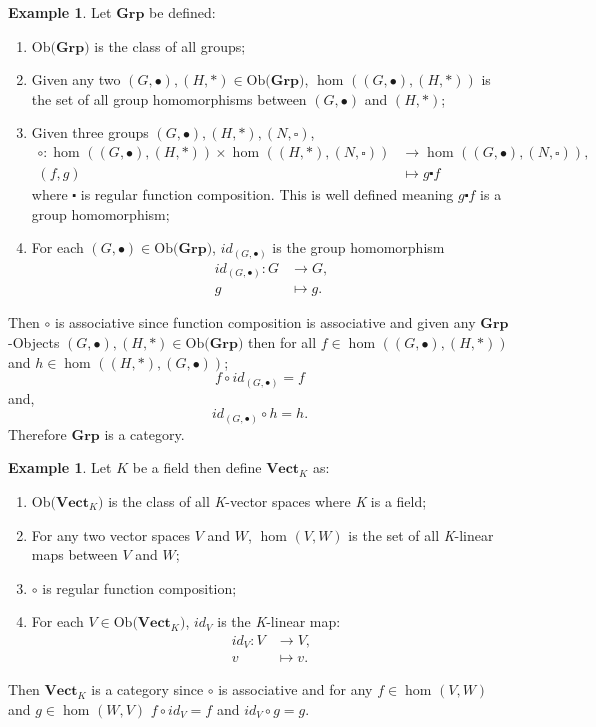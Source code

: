 \documentclass[11pt,a4paper]{article}
\theoremstyle{definition}
\newtheorem{example}[thm]{Example}
\newcommand\ho[3][]{\hom_{#1}(#2,#3)}
\newcommand\ob[1]{\mathrm{Ob(}#1\mathrm{)}}
\newcommand\objs[1]{#1-Objects}
\numberwithin{equation}{section}
\begin{document}
\begin{example}
\label{exe:catoggroups}
Let $\mathbf{Grp}$ be defined:
\begin{enumerate}
    \item $\ob{\mathbf{Grp}}$ is the class of all groups;
    \item Given any two $(G,\bullet),(H,*)\in\ob{\mathbf{Grp}}$, $\ho{(G,\bullet)}{(H,*)}$ is the set of all group homomorphisms between $(G,\bullet)$ and $(H,*)$;
    \item Given three groups $(G,\bullet),(H,*),(N,\square)$,
    \begin{align*}
        \circ\colon\ho{(G,\bullet)}{(H,*)}\times\ho{(H,*)}{(N,\square)}&\rightarrow\ho{(G,\bullet)}{(N,\square)},\\
        (f,g)&\mapsto g\centerdot f
    \end{align*}
    where $\centerdot$ is regular function composition. 
    This is well defined meaning $g\centerdot f$ is a group homomorphism;
    \item For each $(G,\bullet)\in\ob{\mathbf{Grp}}$, $id_{(G,\bullet)}$ is the group homomorphism
    \begin{align*}
        id_{(G,\bullet)}\colon G &\rightarrow G,\\
        g &\mapsto g.
    \end{align*}
\end{enumerate}
Then $\circ$ is associative since function composition is associative and given any \objs{$\mathbf{Grp}$} $(G,\bullet),(H,*)\in\ob{\mathbf{Grp}}$ then for all $f\in\ho{(G,\bullet)}{(H,*)}$ and $h\in\ho{(H,*)}{(G,\bullet)}$; \[f\circ id_{(G,\bullet)} = f\] and, \[id_{(G,\bullet)}\circ h = h.\]
Therefore $\mathbf{Grp}$ is a category.
\end{example}
\begin{example}
Let $K$ be a field then define $\mathbf{Vect_{\textit{K}}}$ as:
\begin{enumerate}
    \item $\ob{\mathbf{Vect_{\textit{K}}}}$ is the class of all \textit{K}-vector spaces where \textit{K} is a field;
    \item For any two vector spaces $V$ and $W$, $\ho{V}{W}$ is the set of all \textit{K}-linear maps between $V$ and $W$;
    \item $\circ$ is regular function composition;
    \item For each $V\in\ob{\mathbf{Vect_{\textit{K}}}}$, $id_{V}$ is the \textit{K}-linear map:
    \begin{align*}
        id_{V}\colon V &\rightarrow V,\\
        v &\mapsto v.
    \end{align*}
    \end{enumerate}
    Then $\mathbf{Vect_{\textit{K}}}$ is a category since $\circ$ is associative and for any $f\in\ho{V}{W}$ and $g\in\ho{W}{V}$ $f\circ id_{V} = f$ and $id_{V}\circ g= g$.
\end{example}
\end{document}
